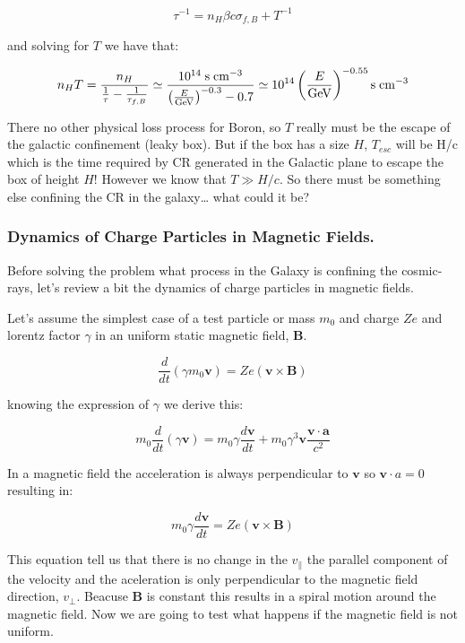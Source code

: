 \documentclass[
  letterpaper,
  DIV=11,
  numbers=noendperiod]{scrreprt}
\begin{document}
\[\tau^{-1} =  n_H \beta c \sigma_{f,B} + T^{-1}\]

and solving for \(T\) we have that:

\[n_H T = \frac{n_H}{\frac{1}{\tau} - \frac{1}{\tau_{f,B}}} \simeq \frac{10^{14} \; \rm{s}\;\rm{cm}^{-3}}{\left(\frac{E}{\mathrm{GeV}}\right)^{-0.3} -0.7} \simeq 10^{14}\left(\frac{E}{\mathrm{GeV}}\right)^{-0.55} \rm{s}\;\rm{cm}^{-3}\]

There no other physical loss process for Boron, so \(T\) really must be
the escape of the galactic confinement (leaky box). But if the box has a
size \(H\), \(T_{esc}\) will be H/c which is the time required by CR
generated in the Galactic plane to escape the box of height \(H\)!
However we know that \(T \gg H/c\). So there must be something else
confining the CR in the galaxy\ldots{} what could it be?

\subsubsection{Dynamics of Charge Particles in Magnetic
Fields.}\label{dynamics-of-charge-particles-in-magnetic-fields.}

Before solving the problem what process in the Galaxy is confining the
cosmic-rays, let's review a bit the dynamics of charge particles in
magnetic fields.

Let's assume the simplest case of a test particle or mass \(m_0\) and
charge \(Ze\) and lorentz factor \(\gamma\) in an uniform static
magnetic field, \({\mathbf B}\).

\[\frac{d}{dt}(\gamma m_0 {\mathbf v}) = Ze ( {\mathbf v} \times {\mathbf B})\]

knowing the expression of \(\gamma\) we derive this:

\[
m_0\frac{d}{dt}(\gamma \mathbf{v}) = m_0\gamma\frac{d {\mathbf v}}{dt} + m_0\gamma^3 {\mathbf v}\frac{ \mathbf{v} \cdot {\mathbf a}}{c^2}\]

In a magnetic field the acceleration is always perpendicular to
\({\mathbf v}\) so \({\mathbf v\cdot a} = 0\) resulting in:

\[m_0\gamma\frac{d{\mathbf v}}{dt} =  Ze ( {\mathbf v} \times {\mathbf B})\]

This equation tell us that there is no change in the \(v_{\parallel}\)
the parallel component of the velocity and the aceleration is only
perpendicular to the magnetic field direction, \(v_{\perp}\). Beacuse
\({\mathbf B}\) is constant this results in a spiral motion around the
magnetic field. Now we are going to test what happens if the magnetic
field is not uniform.
\end{document}
